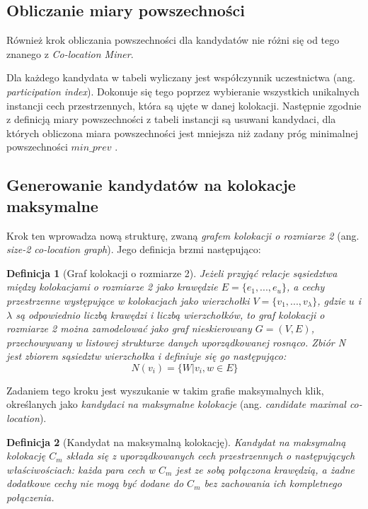 \documentclass[12pt]{article}
\newtheorem{defin}{Definicja}
\begin{document}
\subsection{Obliczanie miary powszechności}

Również krok obliczania powszechności dla kandydatów nie różni się od tego znanego z \textit{Co-location Miner}.

Dla każdego kandydata w tabeli wyliczany jest współczynnik uczestnictwa (ang. \textit{participation index}). Dokonuje się tego poprzez wybieranie wszystkich unikalnych instancji cech przestrzennych, która są ujęte w danej kolokacji. Następnie zgodnie z definicją miary powszechności z tabeli instancji są usuwani kandydaci, dla których obliczona miara powszechności jest mniejsza niż zadany próg minimalnej powszechności $ min\_prev $ \cite{huang}.

\subsection{Generowanie kandydatów na kolokacje maksymalne}

Krok ten wprowadza nową strukturę, zwaną \textit{grafem kolokacji o rozmiarze 2} (ang. \textit{size-2 co-location graph}). Jego definicja brzmi następująco:

\begin{defin}[Graf kolokacji o rozmiarze 2]
Jeżeli przyjąć relacje sąsiedztwa między kolokacjami o rozmiarze 2 jako krawędzie $ E = \{e_{1},...,e_{u}\}$, a cechy przestrzenne występujące w kolokacjach jako wierzchołki $ V = \{v_{1},...,v_{\lambda}\}$, gdzie $ u $ i $ \lambda $ są odpowiednio liczbą krawędzi i liczbą wierzchołków, to graf kolokacji o rozmiarze 2 można zamodelować jako graf nieskierowany $ G= (V, E)$, przechowywany w listowej strukturze danych uporządkowanej rosnąco. Zbiór N jest zbiorem sąsiedztw wierzchołka i definiuje się go następująco:
\begin{equation}
N(v_{i}) = \{W|{v_{i},w} \in E\}
\end{equation}
\label{def:size2-col-graph}
\end{defin}

Zadaniem tego kroku jest wyszukanie w takim grafie maksymalnych klik, określanych jako \textit{kandydaci na maksymalne kolokacje} (ang. \textit{candidate maximal co-location}).

\begin{defin}[Kandydat na maksymalną kolokację]
Kandydat na maksymalną kolokację $ C_{m} $ składa się z uporządkowanych cech przestrzennych o następujących właściwościach: każda para cech w  $ C_{m} $  jest ze sobą połączona krawędzią, a żadne dodatkowe cechy nie mogą być dodane do $ C_{m} $ bez zachowania ich kompletnego połączenia.
\end{defin}
\end{document}
